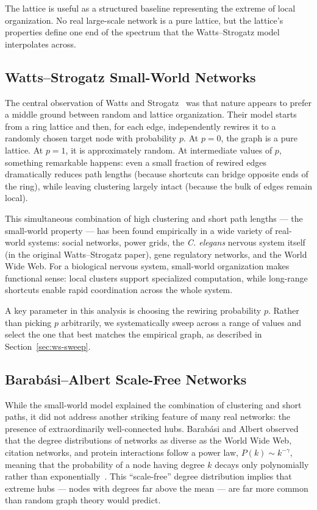 \documentclass[12pt,a4paper]{report}
\begin{document}
The lattice is useful as a structured baseline representing the extreme of local organization. No real large-scale network is a pure lattice, but the lattice's properties define one end of the spectrum that the Watts--Strogatz model interpolates across.

\subsection{Watts--Strogatz Small-World Networks}

The central observation of Watts and Strogatz~\cite{watts1998collective} was that nature appears to prefer a middle ground between random and lattice organization. Their model starts from a ring lattice and then, for each edge, independently rewires it to a randomly chosen target node with probability $p$. At $p=0$, the graph is a pure lattice. At $p=1$, it is approximately random. At intermediate values of $p$, something remarkable happens: even a small fraction of rewired edges dramatically reduces path lengths (because shortcuts can bridge opposite ends of the ring), while leaving clustering largely intact (because the bulk of edges remain local).

This simultaneous combination of high clustering and short path lengths — the small-world property — has been found empirically in a wide variety of real-world systems: social networks, power grids, the \textit{C. elegans} nervous system itself (in the original Watts--Strogatz paper), gene regulatory networks, and the World Wide Web. For a biological nervous system, small-world organization makes functional sense: local clusters support specialized computation, while long-range shortcuts enable rapid coordination across the whole system.

A key parameter in this analysis is choosing the rewiring probability $p$. Rather than picking $p$ arbitrarily, we systematically sweep across a range of values and select the one that best matches the empirical graph, as described in Section~\ref{sec:ws-sweep}.

\subsection{Barab\'{a}si--Albert Scale-Free Networks}

While the small-world model explained the combination of clustering and short paths, it did not address another striking feature of many real networks: the presence of extraordinarily well-connected hubs. Barab\'{a}si and Albert observed that the degree distributions of networks as diverse as the World Wide Web, citation networks, and protein interactions follow a power law, $P(k) \sim k^{-\gamma}$, meaning that the probability of a node having degree $k$ decays only polynomially rather than exponentially~\cite{barabasi1999emergence}. This ``scale-free'' degree distribution implies that extreme hubs — nodes with degrees far above the mean — are far more common than random graph theory would predict.
\end{document}
